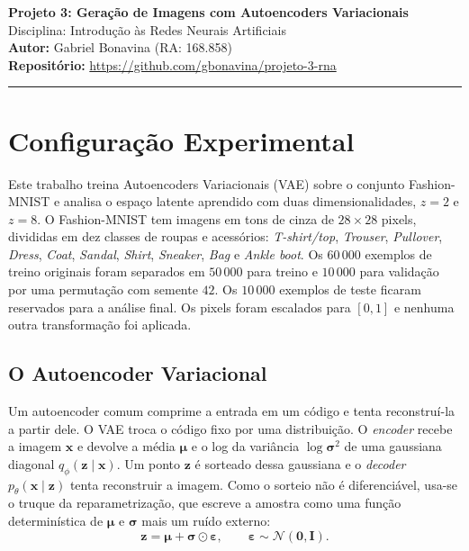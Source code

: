 \documentclass[11pt,a4paper]{article}
\begin{document}
\begin{center}
    {\LARGE \textbf{Projeto 3: Geração de Imagens com Autoencoders Variacionais}} \\[0.35em]
    {\large Disciplina: Introdução às Redes Neurais Artificiais} \\[0.3em]
    \textbf{Autor:} Gabriel Bonavina (RA: 168.858)\\[0.2em]
    \textbf{Repositório:} \url{https://github.com/gbonavina/projeto-3-rna}
\end{center}
\vspace{-0.5em}
\hrule
\vspace{0.8em}

\section*{Configuração Experimental}

Este trabalho treina Autoencoders Variacionais (VAE) sobre o conjunto Fashion-MNIST e analisa o espaço latente aprendido com duas dimensionalidades, $z = 2$ e $z = 8$. O Fashion-MNIST tem imagens em tons de cinza de $28 \times 28$ pixels, divididas em dez classes de roupas e acessórios: \textit{T-shirt/top}, \textit{Trouser}, \textit{Pullover}, \textit{Dress}, \textit{Coat}, \textit{Sandal}, \textit{Shirt}, \textit{Sneaker}, \textit{Bag} e \textit{Ankle boot}. Os $60\,000$ exemplos de treino originais foram separados em $50\,000$ para treino e $10\,000$ para validação por uma permutação com semente $42$. Os $10\,000$ exemplos de teste ficaram reservados para a análise final. Os pixels foram escalados para $[0, 1]$ e nenhuma outra transformação foi aplicada.

\subsection*{O Autoencoder Variacional}

Um autoencoder comum comprime a entrada em um código e tenta reconstruí-la a partir dele. O VAE troca o código fixo por uma distribuição. O \textit{encoder} recebe a imagem $\mathbf{x}$ e devolve a média $\boldsymbol{\mu}$ e o log da variância $\log \boldsymbol{\sigma}^2$ de uma gaussiana diagonal $q_\phi(\mathbf{z} \mid \mathbf{x})$. Um ponto $\mathbf{z}$ é sorteado dessa gaussiana e o \textit{decoder} $p_\theta(\mathbf{x} \mid \mathbf{z})$ tenta reconstruir a imagem. Como o sorteio não é diferenciável, usa-se o truque da reparametrização, que escreve a amostra como uma função determinística de $\boldsymbol{\mu}$ e $\boldsymbol{\sigma}$ mais um ruído externo:
\begin{equation}
    \mathbf{z} = \boldsymbol{\mu} + \boldsymbol{\sigma} \odot \boldsymbol{\varepsilon}, \qquad \boldsymbol{\varepsilon} \sim \mathcal{N}(\mathbf{0}, \mathbf{I}).
\end{equation}
\end{document}
